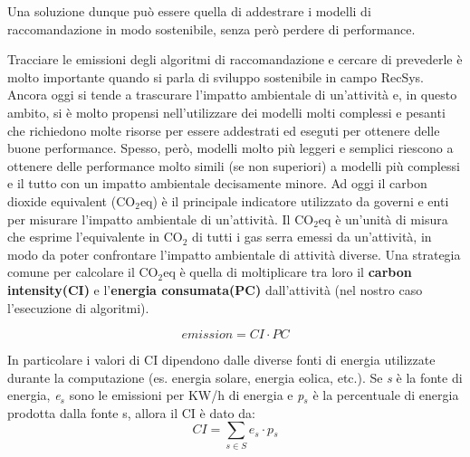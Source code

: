 \noindent Una soluzione dunque può essere quella di addestrare i modelli di raccomandazione in modo sostenibile, senza però perdere di performance.

\noindent
Tracciare le emissioni degli algoritmi di raccomandazione e cercare di prevederle è molto importante quando si parla di sviluppo sostenibile in campo RecSys. Ancora oggi si tende a trascurare l'impatto ambientale di un'attività e, in questo ambito, si è molto propensi nell'utilizzare dei modelli molti complessi e pesanti
che richiedono molte risorse per essere addestrati ed eseguti per ottenere delle buone performance. Spesso, però, modelli molto più leggeri e semplici riescono a ottenere delle performance molto simili (se non superiori) a modelli più complessi e il tutto con un impatto ambientale decisamente minore.
Ad oggi il carbon dioxide equivalent (CO$_2$eq) è il principale indicatore utilizzato da governi e enti per misurare l'impatto ambientale di un'attività.
Il CO$_2$eq è un'unità di misura che esprime l'equivalente in CO$_2$ di tutti i gas serra emessi da un'attività, in modo da poter confrontare l'impatto ambientale di attività diverse.
Una strategia comune per calcolare il CO$_2$eq è quella di moltiplicare tra loro il \textbf{carbon intensity(CI)} e l'\textbf{energia consumata(PC)} dall'attività (nel nostro caso l'esecuzione di algoritmi).



\begin{equation*}
    \textit{emission} = \textit{CI}  \cdot \textit{PC}
\end{equation*}

\noindent In particolare i valori di CI dipendono dalle diverse fonti di energia utilizzate durante la computazione 
(es. energia solare, energia eolica, etc.). Se \textit{s} è la fonte di energia,  \textit{e$_s$} sono le emissioni per KW/h di energia e \textit{p$_s$}  è la percentuale di energia prodotta dalla fonte s, allora il CI è dato da:
\begin{equation*}
    \textit{CI} = \sum_{s \in S} \textit{e$_s$} \cdot \textit{p$_s$}
\end{equation*}


